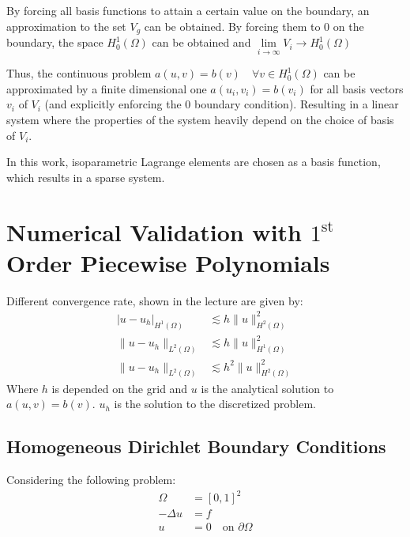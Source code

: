 \documentclass[11pt,a4paper]{article}
\begin{document}
By forcing all basis functions to attain a certain value on the boundary, an
approximation to the set $V_g$ can be obtained. By forcing them to 0 on the
boundary, the space $H^1_0(\Omega)$ can be obtained and
$\lim\limits_{i\to\infty}V_i \to H^1_0(\Omega)$

Thus, the continuous problem $a(u,v) = b(v) \quad \forall v \in H^1_0(\Omega)$
can be approximated by a finite dimensional one $a(u_i,v_i) = b(v_i)$ for all
basis vectors $v_i$ of $V_i$ (and explicitly enforcing the 0 boundary condition).
Resulting in a linear system where the properties of the system heavily depend
on the choice of basis of $V_i$.

In this work, isoparametric Lagrange elements are chosen as a basis function,
which results in a sparse system.

\section*{Numerical Validation with $1^{\text{st}}$ Order Piecewise Polynomials}
Different convergence rate, shown in the lecture are given by:
\begin{equation}
  \begin{split}
    \left|u-u_h\right|_{H^1(\Omega)} &\lesssim h \lVert u\rVert^2_{H^2(\Omega)}\\
    \lVert u - u_h \rVert_{L^2(\Omega)} &\lesssim h\lVert u\rVert^2_{H^1(\Omega)}\\
    \lVert u - u_h \rVert_{L^2(\Omega)} &\lesssim h^2\lVert u\rVert^2_{H^2(\Omega)}
  \end{split}
\end{equation}
Where $h$ is depended on the grid and $u$ is the analytical solution to $a(u,v) = b(v)$.
$u_h$ is the solution to the discretized problem.

\subsection*{Homogeneous Dirichlet Boundary Conditions}
Considering the following problem:
\begin{equation}
  \begin{split}
    \Omega &= \left[0,1\right]^2\\
    -\Delta u &= f\\
    u &= 0 \quad \text{on } \partial \Omega\\
  \end{split}
\end{equation}
\end{document}

